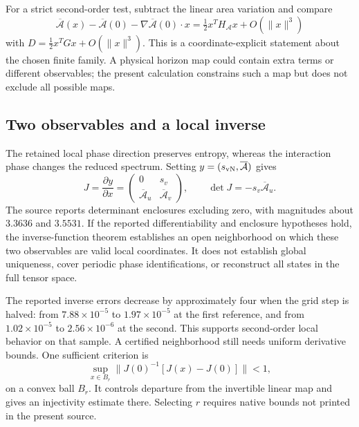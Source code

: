 For a strict second-order test, subtract the linear area variation and compare
\begin{equation}
 \overline{\mathcal A}(x)-\overline{\mathcal A}(0)
 -\nabla\overline{\mathcal A}(0)\cdot x
 =\tfrac12x^TH_{\mathcal A}x+O(\|x\|^3)
\end{equation}
with $D=\tfrac12x^TGx+O(\|x\|^3)$. This is a coordinate-explicit statement about the chosen finite family. A physical horizon map could contain extra terms or different observables; the present calculation constrains such a map but does not exclude all possible maps.

\subsection{Two observables and a local inverse}
The retained local phase direction preserves entropy, whereas the interaction phase changes the reduced spectrum. Setting $y=(s_{\rm vN},\overline{\mathcal A})$ gives
\begin{equation}
 J=\frac{\partial y}{\partial x}
 =\begin{pmatrix}0&s_v\\ \overline{\mathcal A}_u&\overline{\mathcal A}_v\end{pmatrix},
 \qquad \det J=-s_v\overline{\mathcal A}_u.
 \label{c7:jacobian}
\end{equation}
The source reports determinant enclosures excluding zero, with magnitudes about $3.3636$ and $3.5531$. If the reported differentiability and enclosure hypotheses hold, the inverse-function theorem establishes an open neighborhood on which these two observables are valid local coordinates. It does not establish global uniqueness, cover periodic phase identifications, or reconstruct all states in the full tensor space.

The reported inverse errors decrease by approximately four when the grid step is halved: from $7.88\times10^{-5}$ to $1.97\times10^{-5}$ at the first reference, and from $1.02\times10^{-5}$ to $2.56\times10^{-6}$ at the second. This supports second-order local behavior on that sample. A certified neighborhood still needs uniform derivative bounds. One sufficient criterion is
\begin{equation}
 \sup_{x\in B_r}\|J(0)^{-1}[J(x)-J(0)]\|<1,
 \label{c7:inversecriterion}
\end{equation}
on a convex ball $B_r$. It controls departure from the invertible linear map and gives an injectivity estimate there. Selecting $r$ requires native bounds not printed in the present source.

